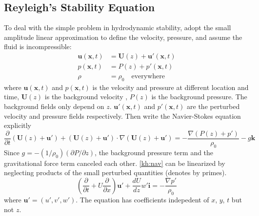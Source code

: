 \subsection{Reyleigh's Stability Equation}
To deal with the simple problem in hydrodynamic stability, adopt the
small amplitude linear approximation to define the velocity,
pressure, and assume the fluid is incompressible:
\begin{subequations}\label{kh:ln}
\begin{align}
    \mathbf{u}(\mathbf{x},t)&=\mathbf{U}(z)+\mathbf{u}'(\mathbf{x},t)\label{kh:lnu}\\
    p(\mathbf{x},t)&=P(z)+p'(\mathbf{x},t)\label{kh:lnp}\\
    \rho&=\rho_0\quad\text{everywhere}\label{kh:lnrho}
\end{align}
\end{subequations}
where $\mathbf{u}(\mathbf{x},t)$ and $p(\mathbf{x},t)$ is the
velocity and pressure at different location and time,
$\mathbf{U}(z)$ is the background velocity , $P(z)$ is the
background pressure. The background fields only depend on $z$.
$\mathbf{u}'(\mathbf{x},t)$ and $p'(\mathbf{x},t)$ are the perturbed
velocity and pressure fields respectively.
\newslide
Then write the Navier-Stokes equation explicitly
\begin{equation}\label{kh:nav}
\frac{\partial}{\partial
t}(\mathbf{U}(z)+\mathbf{u}')+(\mathbf{U}(z)+\mathbf{u}')
\cdot\nabla(\mathbf{U}(z)+\mathbf{u}')=-\frac{\nabla(P(z)+p')}{\rho_0}-g\mathbf{k}
\end{equation}
Since $g=-(1/\rho_0)(\partial P/\partial z)$, the background
pressure term and the gravitational force term canceled each other.
\newslide
\eqref{kh:nav} can be linearized by neglecting products of the small
perturbed quantities (denotes by primes).
\begin{equation}\label{kh:lin}
(\frac{\partial}{\partial t}+U\frac{\partial}{\partial
x})\mathbf{u}'+\frac{dU}{dz}w'\mathbf{i}=-\frac{\nabla p'}{\rho_0}
\end{equation}
where $\mathbf{u}' = (u',v',w')$.
\newslide
The equation has coefficients indepedent of $x$, $y$, $t$ but not
$z$.

